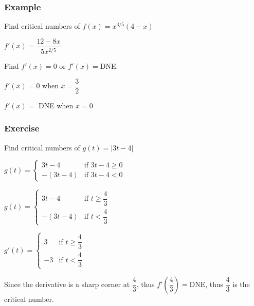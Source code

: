 \documentclass[t]{beamer}
\theoremstyle{plain}
\theoremstyle{definition}
\begin{document}
\begin{frame}

\frametitle{Example}

Find critical numbers of $f(x) = x^{3/5} (4-x)$ \pause

\vspace{1em}

$f'(x) = \dfrac{12-8x}{5x^{2/5}}$

\vspace{1em}

Find $f'(x) = 0$ or $f'(x) = $DNE.

\vspace{1em}

$f'(x) = 0$ when $x = \dfrac{3}{2}$

\vspace{1em}

$f'(x) = $ DNE when $x = 0$

\end{frame}

\begin{frame}

\frametitle{Exercise}
\footnotesize

Find critical numbers of $g(t) = |3t-4|$ \pause

\vspace{1em}

 $g(t) = \begin{cases}
3t-4&\mbox{if }3t-4 \geq 0\\
-(3t-4)&\mbox{if }3t-4 < 0
\end{cases}$

 $g(t) = \begin{cases}
3t-4&\mbox{if }t \geq \dfrac{4}{3}\\
-(3t-4)&\mbox{if }t < \dfrac{4}{3}
\end{cases}$

 $g'(t) = \begin{cases}
3&\mbox{if }t \geq \dfrac{4}{3}\\
-3&\mbox{if }t < \dfrac{4}{3}
\end{cases}$

Since the derivative is a sharp corner at $\dfrac{4}{3}$, thus $f'(\dfrac{4}{3}) = $DNE, thus $\dfrac{4}{3}$ is the critical number.

\end{frame}
\end{document}
